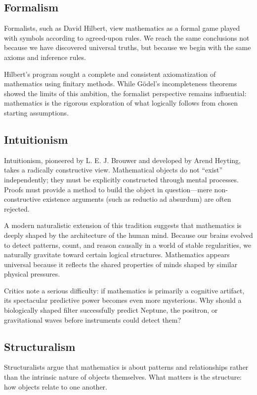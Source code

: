 \subsection*{Formalism}

Formalists, such as David Hilbert, view mathematics as a formal game played with symbols according to agreed-upon rules.
We reach the same conclusions not because we have discovered universal truths, but because we begin with the same axioms and inference rules.

Hilbert's program sought a complete and consistent axiomatization of mathematics using finitary methods.
While Gödel's incompleteness theorems showed the limits of this ambition, the formalist perspective remains influential:
mathematics is the rigorous exploration of what logically follows from chosen starting assumptions.

\subsection*{Intuitionism}

Intuitionism, pioneered by L. E. J. Brouwer and developed by Arend Heyting, takes a radically constructive view.
Mathematical objects do not ``exist'' independently; they must be explicitly constructed through mental processes.
Proofs must provide a method to build the object in question---mere non-constructive existence arguments (such as reductio ad absurdum) are often rejected.

A modern naturalistic extension of this tradition suggests that mathematics is deeply shaped by the architecture of the human mind.
Because our brains evolved to detect patterns, count, and reason causally in a world of stable regularities, we naturally gravitate toward certain logical structures.
Mathematics appears universal because it reflects the shared properties of minds shaped by similar physical pressures.

Critics note a serious difficulty: if mathematics is primarily a cognitive artifact, its spectacular predictive power becomes even more mysterious.
Why should a biologically shaped filter successfully predict Neptune, the positron, or gravitational waves before instruments could detect them?

\subsection*{Structuralism}

Structuralists argue that mathematics is about patterns and relationships rather than the intrinsic nature of objects themselves.
What matters is the structure: how objects relate to one another.

